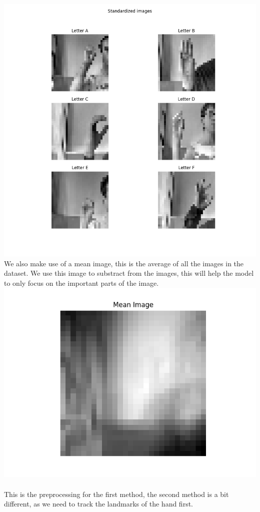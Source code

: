 \documentclass[../paper.tex]{subfiles}
\begin{document}
    \includegraphics[width=\linewidth]{letters_grid_standardized_6}
    We also make use of a mean image, this is the average of all the images in the dataset.
    We use this image to substract from the images, this will help the model to only focus on the important parts of the image.
    \includegraphics[width=\linewidth]{mean_image_6}
    \\\\
    This is the preprocessing for the first method, the second method is a bit different, as we need to track the landmarks of the hand first.
\end{document}
